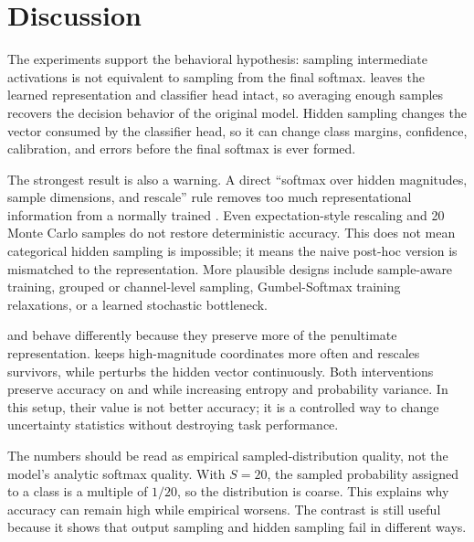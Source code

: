 \section{Discussion}
\label{sec:discussion}

The experiments support the behavioral hypothesis: sampling intermediate activations is not equivalent to sampling from the final softmax. \outputsample leaves the learned representation and classifier head intact, so averaging enough samples recovers the decision behavior of the original model. Hidden sampling changes the vector consumed by the classifier head, so it can change class margins, confidence, calibration, and errors before the final softmax is ever formed.

The strongest result is also a warning. A direct ``softmax over hidden magnitudes, sample dimensions, and rescale'' rule removes too much representational information from a normally trained \cnn. Even expectation-style rescaling and 20 Monte Carlo samples do not restore deterministic accuracy. This does not mean categorical hidden sampling is impossible; it means the naive post-hoc version is mismatched to the representation. More plausible designs include sample-aware training, grouped or channel-level sampling, Gumbel-Softmax training relaxations, or a learned stochastic bottleneck.

\sap and \gaussian behave differently because they preserve more of the penultimate representation. \sap keeps high-magnitude coordinates more often and rescales survivors, while \gaussian perturbs the hidden vector continuously. Both interventions preserve accuracy on \mnist and \fashionmnist while increasing entropy and probability variance. In this setup, their value is not better accuracy; it is a controlled way to change uncertainty statistics without destroying task performance.

The \outputsample \nll numbers should be read as empirical sampled-distribution quality, not the model's analytic softmax quality. With $S=20$, the sampled probability assigned to a class is a multiple of $1/20$, so the distribution is coarse. This explains why accuracy can remain high while empirical \nll worsens. The contrast is still useful because it shows that output sampling and hidden sampling fail in different ways.

